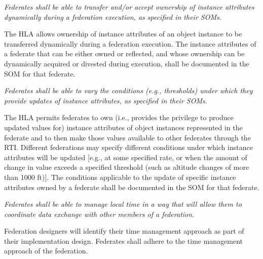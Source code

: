 
\textit{Federates shall be able to transfer and/or accept ownership of instance attributes dynamically during a\linebreak
federation execution, as specified in their SOMs.}
\vspace{3.3pt}

The HLA allows ownership of instance attributes of an object instance to be transferred dynamically during\linebreak
a federation execution. The instance attributes of a federate that can be either owned or reflected, and whose\linebreak
ownership can be dynamically acquired or divested during execution, shall be documented in the SOM for\linebreak
that federate.


\textit{Federates shall be able to vary the conditions (e.g., thresholds) under which they provide updates of\linebreak
instance attributes, as specified in their SOMs.}
\vspace{3.3pt}

The HLA permits federates to own (i.e., provides the privilege to produce updated values for) instance\linebreak
attributes of object instances represented in the federate and to then make those values available to other\linebreak
federates through the RTI. Different federations may specify different conditions under which instance\linebreak
attributes will be updated [e.g., at some specified rate, or when the amount of change in value exceeds a\linebreak
specified threshold (such as altitude changes of more than 1000 ft)]. The conditions applicable to the update\linebreak
of specific instance attributes owned by a federate shall be documented in the SOM for that federate.


\textit{Federates shall be able to manage local time in a way that will allow them to coordinate data exchange with\linebreak
other members of a federation.}
\vspace{3.3pt}

Federation designers will identify their time management approach as part of their implementation design.\linebreak
Federates shall adhere to the time management approach of the federation.
